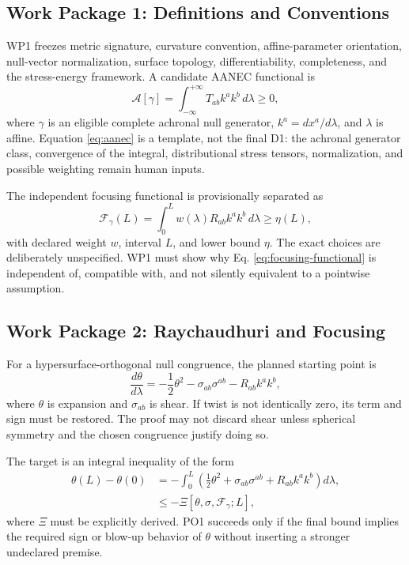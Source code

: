 \documentclass[conference]{IEEEtran}
\begin{document}
\subsection{Work Package 1: Definitions and Conventions}
WP1 freezes metric signature, curvature convention, affine-parameter orientation, null-vector normalization, surface topology, differentiability, completeness, and the stress-energy framework. A candidate AANEC functional is
\begin{equation}
\mathcal{A}[\gamma]
=\int_{-\infty}^{+\infty}T_{ab}k^ak^b\,d\lambda \geq 0,
\label{eq:aanec}
\end{equation}
where $\gamma$ is an eligible complete achronal null generator, $k^a=dx^a/d\lambda$, and $\lambda$ is affine. Equation \eqref{eq:aanec} is a template, not the final D1: the achronal generator class, convergence of the integral, distributional stress tensors, normalization, and possible weighting remain human inputs.

The independent focusing functional is provisionally separated as
\begin{equation}
\mathcal{F}_{\gamma}(L)
=\int_{0}^{L}w(\lambda)R_{ab}k^ak^b\,d\lambda
\geq \eta(L),
\label{eq:focusing-functional}
\end{equation}
with declared weight $w$, interval $L$, and lower bound $\eta$. The exact choices are deliberately unspecified. WP1 must show why Eq. \eqref{eq:focusing-functional} is independent of, compatible with, and not silently equivalent to a pointwise assumption.

\subsection{Work Package 2: Raychaudhuri and Focusing}
For a hypersurface-orthogonal null congruence, the planned starting point is
\begin{equation}
\frac{d\theta}{d\lambda}
=-\frac{1}{2}\theta^2-\sigma_{ab}\sigma^{ab}
-R_{ab}k^ak^b,
\label{eq:raychaudhuri}
\end{equation}
where $\theta$ is expansion and $\sigma_{ab}$ is shear. If twist is not identically zero, its term and sign must be restored. The proof may not discard shear unless spherical symmetry and the chosen congruence justify doing so.

The target is an integral inequality of the form
\begin{align}
\theta(L)-\theta(0)
&=-\int_{0}^{L}\left(\frac{1}{2}\theta^2
+\sigma_{ab}\sigma^{ab}
+R_{ab}k^ak^b\right)d\lambda, \nonumber\\
&\leq -\Xi[\theta,\sigma,\mathcal{F}_{\gamma};L],
\label{eq:integrated-raychaudhuri}
\end{align}
where $\Xi$ must be explicitly derived. PO1 succeeds only if the final bound implies the required sign or blow-up behavior of $\theta$ without inserting a stronger undeclared premise.
\end{document}
